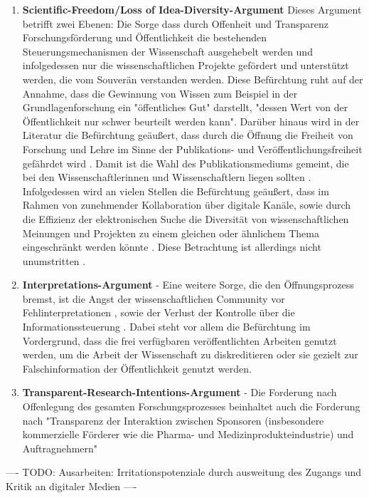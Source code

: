 \begin{enumerate}
\item \textbf{Scientific-Freedom/Loss of Idea-Diversity-Argument}
Dieses Argument betrifft zwei Ebenen: Die Sorge dass durch Offenheit und Transparenz Forschungsförderung und Öffentlichkeit die bestehenden Steuerungsmechanismen der Wissenschaft ausgehebelt werden und infolgedessen nur die wissenschaftlichen Projekte gefördert und unterstützt werden, die vom Souverän verstanden werden. Diese Befürchtung ruht auf der Annahme, dass die Gewinnung von Wissen zum Beispiel in der Grundlagenforschung ein "öffentliches Gut" darstellt, "dessen Wert von der Öffentlichkeit nur schwer beurteilt werden kann"\cite{osterloh2008anreize}. Darüber hinaus wird in der Literatur die Befürchtung geäußert, dass durch die Öffnung die Freiheit von Forschung und Lehre im Sinne der Publikations- und Veröffentlichungsfreiheit gefährdet wird \cite{Jochum_2009}. Damit ist die Wahl des Publikationsmediums gemeint, die bei den Wissenschaftlerinnen und Wissenschaftlern liegen sollten \cite{bbaw_publizieren_2015} . Infolgedessen wird an vielen Stellen die Befürchtung geäußert, dass im Rahmen von zunehmender Kollaboration über digitale Kanäle, sowie durch die Effizienz der elektronischen Suche die Diversität von wissenschaftlichen Meinungen und Projekten zu einem gleichen oder ähnlichem Thema eingeschränkt werden könnte \cite{Evans_2008}. Diese Betrachtung ist allerdings nicht unumstritten \cite{lariviere2009decline}.
\item \textbf{Interpretations-Argument} - Eine weitere Sorge, die den Öffnungsprozess bremst, ist die Angst der wissenschaftlichen Community vor  Fehlinterpretationen \cite{grand_2012_open}, sowie der Verlust der Kontrolle über die Informationssteuerung \cite{gibbons_1994}. Dabei steht vor allem die Befürchtung im Vordergrund, dass die frei verfügbaren veröffentlichten Arbeiten genutzt werden, um die Arbeit der Wissenschaft zu diskreditieren oder sie gezielt zur Falschinformation der Öffentlichkeit genutzt werden.
\item \textbf{Transparent-Research-Intentions-Argument} - Die Forderung nach Offenlegung des gesamten Forschungsprozesses beinhaltet auch die Forderung nach "Transparenz der Interaktion zwischen Sponsoren (insbesondere kommerzielle Förderer wie die Pharma- und Medizinprodukteindustrie) und Auftragnehmern" \cite{Stengel_2013}
\end{enumerate}

---- TODO: Ausarbeiten: Irritationspotenziale durch ausweitung des Zugangs und Kritik an digitaler Medien  ----
